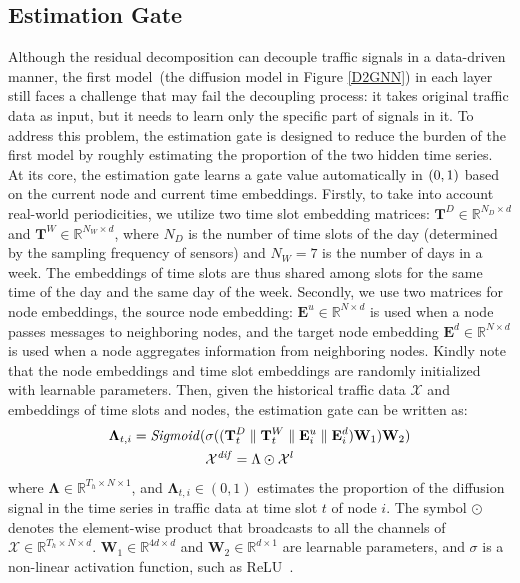 \documentclass[sigconf, nonacm]{acmart}
\def\bb#1{\mathbb{#1}}
\def\b#1{\mathbf{#1}}
\def\cal#1{\mathcal{#1}}
\begin{document}
\subsection{Estimation Gate}
\label{sec_est}
Although the residual decomposition can decouple {\color{black}traffic} signals in a data-driven {\color{black}manner}, the {\color{black}first} model~({\color{black}the diffusion model in Figure \ref{D2GNN}}) in each layer still faces a challenge {\color{black}that may fail the decoupling process}: it takes original traffic data as input, but it needs to learn only the {\color{black}specific part of} signals in it.
To address this problem, the {\color{black} estimation} gate is designed to reduce the burden of the first model by roughly estimating the proportion of the {\color{black}two hidden time series}.
At its core, the {\color{black}estimation gate learns a gate value automatically} in ${\color{black}(}0,1{\color{black})}$ based on the current node and current time {\color{black}embeddings}.
{\color{black}Firstly,} to take into account real-world periodicities, we utilize two time slot embedding matrices: $\b{T}^D\in\bb{R}^{N_D\times d}$ and $\b{T}^W\in\bb{R}^{N_W\times d}$, where $N_D$ is the number of time slots of the day {\color{black}(determined by the sampling frequency of sensors)} and $N_W=7$ is the number of days in a week. The embeddings of time slots are thus shared among slots for the same time of the day and the same day of the week.
{\color{black} Secondly}, we use two matrices for node embeddings, the source node embedding: $\b{E}^u\in\bb{R}^{N\times d}$ is used when a node passes messages to neighboring nodes, and the target node embedding $\b{E}^d\in\bb{R}^{N\times d}$ is used when a node aggregates information from neighboring nodes.
{\color{black}Kindly note that the node embeddings and time slot embeddings are randomly initialized with learnable parameters.}
Then, given {\color{black}the} historical traffic data {\color{black}$\cal{X}$ and embeddings of time slots and nodes}, the {\color{black}estimation} gate can be written as:
\begin{equation}
\begin{aligned}
     \b{\Lambda}_{t, i}=\mathit{Sigmoid}(& \sigma((\b{T}_t^D \parallel \b{T}_t^W \parallel \b{E}_i^{u} \parallel \b{E}_i^{d})\b{W}_1)\b{W}_2)\\ 
     & {\color{black}\mathcal{X}^{\mathit{dif}}}=\Lambda\odot{\color{black}\mathcal{X}^{l}}
\end{aligned}
\label{x_spa}
\end{equation}
{\color{black}where} $\b{\Lambda}\in\bb{R}^{T_h\times N\times 1}$, and  $\b{\Lambda}_{t, i}\in (0,1)$ estimates the proportion of {\color{black}the diffusion signal in the time series in traffic data} at time slot $t$ of node $i$. 
The symbol {\color{black} $\odot$ denotes the element-wise product that broadcasts to all the channels of $\cal{X}\in\mathbb{R}^{T_h\times N\times d}$.}
$\b{W}_1\in\bb{R}^{4d\times d}$ and $\b{W}_2\in\bb{R}^{d\times 1}$ are learnable parameters, and $\sigma$ is a non-linear activation function, such as ReLU~\cite{ReLU}.
\end{document}
